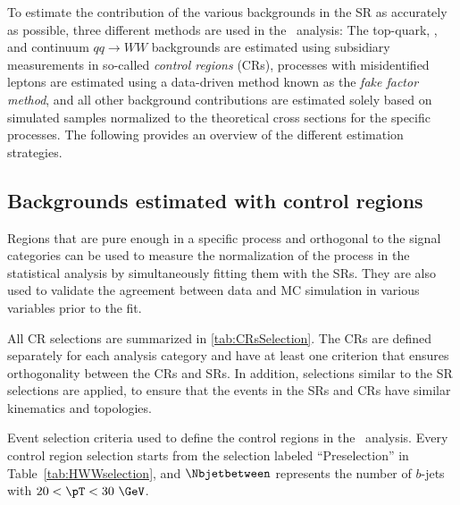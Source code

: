 To estimate the contribution of the various backgrounds in the SR as accurately as possible, three different methods are used in the \HWW\ analysis:
The top-quark, \Zjets, and continuum $qq \to WW$ backgrounds are estimated using subsidiary measurements in so-called \emph{control regions} (CRs), processes with misidentified leptons are estimated using a data-driven method known as the \emph{fake factor method}, and all other background contributions are estimated solely based on simulated samples normalized to the theoretical cross sections for the specific processes.
The following provides an overview of the different estimation strategies. 

\subsection{Backgrounds estimated with control regions}
Regions that are pure enough in a specific process and orthogonal to the signal categories can be used to measure the normalization of the process in the statistical analysis by simultaneously fitting them with the SRs. 
They are also used to validate the agreement between data and MC simulation in various variables prior to the fit.

All CR selections are summarized in \cref{tab:CRsSelection}. 
The CRs are defined separately for each analysis category and have at least one criterion that ensures orthogonality between the CRs and SRs.
In addition, selections similar to the SR selections are applied, to ensure that the events in the SRs and CRs have similar kinematics and topologies. 
\begin{table}[!ht]
    \caption{
      Event selection criteria used to define the control regions in the \hwwenmn\ analysis.
      Every control region selection starts from the selection labeled ``Preselection'' in Table~\ref{tab:HWWselection}, and $\Nbjetbetween$ represents the number of $b$-jets with $20 < \pT < 30~\GeV$.}
  \label{tab:CRsSelection}
  \centering
  \resizebox{\textwidth}{!}{
  
  }
  \end{table}
